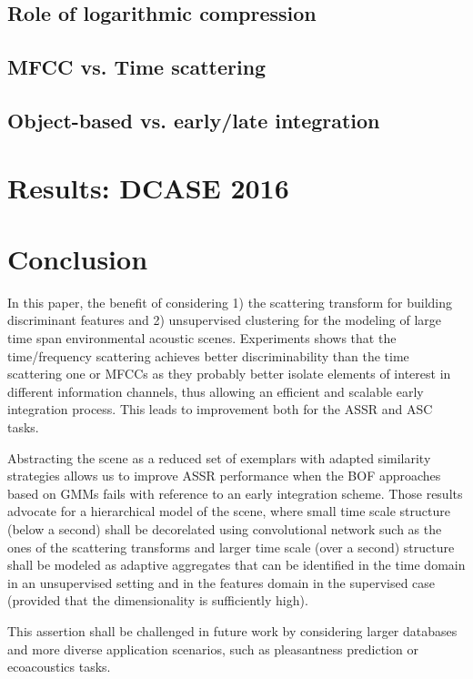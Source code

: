 \documentclass[journal]{IEEEtran}
\makeatletter
\newcommand*{\vs}{vs.\@\xspace}
\makeatother
\begin{document}
\subsection{Role of logarithmic compression}

\subsection{MFCC \vs Time scattering}

\subsection{Object-based \vs early/late integration}

\section{Results: DCASE 2016}

\section{Conclusion}

In this paper, the benefit of considering 1) the scattering transform for building discriminant features and 2) unsupervised clustering for the modeling of large time span environmental acoustic scenes. Experiments shows that the time/frequency scattering achieves better discriminability than the time scattering one or MFCCs as they probably better isolate elements of interest in different information channels, thus allowing an efficient and scalable early integration process. This leads to improvement both for the ASSR and ASC tasks.

Abstracting the scene as a reduced set of exemplars with adapted similarity strategies allows us to improve ASSR performance when the BOF approaches based on GMMs fails with reference to an early integration scheme. Those results advocate for a hierarchical model of the scene, where small time scale structure  (below a second) shall be decorelated using convolutional network such as the ones of the scattering transforms and larger time scale (over a second) structure shall be modeled as adaptive aggregates that can be identified in the time domain in an unsupervised setting and in the features domain in the supervised case (provided that the dimensionality is sufficiently high). 

This assertion shall be challenged in future work by considering larger databases and more diverse application scenarios, such as pleasantness prediction \cite{acta} or ecoacoustics tasks.
\end{document}
